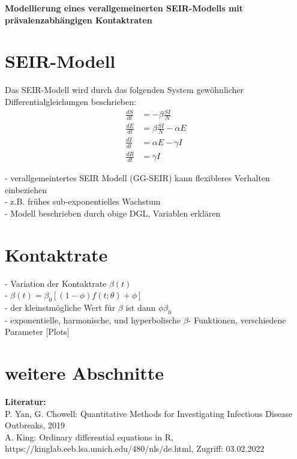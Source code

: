 \documentclass{scrartcl}
\begin{document}
\begin{center}
\huge\textbf{Modellierung eines verallgemeinerten SEIR-Modells mit prävalenzabhängigen Kontaktraten}
\end{center}

\section{SEIR-Modell}

Das SEIR-Modell wird durch das folgenden System gewöhnlicher Differentialgleichungen beschrieben:
\begin{align*}
\frac{dS}{dt} &= -\beta \frac{SI}{N} \\[10pt]
\frac{dE}{dt} &= \beta \frac{SI}{N} - \alpha E \\[10pt]
\frac{dI}{dt} &= \alpha E - \gamma I \\[10pt]
\frac{dR}{dt} &= \gamma I 
\end{align*}

- verallgemeintertes SEIR Modell (GG-SEIR) kann flexibleres Verhalten einbeziehen \\
- z.B. frühes sub-exponentielles Wachstum \\
- Modell beschrieben durch obige DGL, Variablen erklären \\

\section{Kontaktrate}
- Variation der Kontaktrate $\beta(t) $ \\
- $\beta(t) = \beta_0 [(1- \phi) f(t; \theta) + \phi]$ \\
- der kleinstmögliche Wert für $\beta$ ist dann $\phi\beta_0$ \\

- exponentielle, harmonische, und hyperbolische $\beta$- Funktionen, verschiedene Parameter [Plots] \\

\section{weitere Abschnitte}









\vspace*{\fill}
\textbf{Literatur:}  \\
P. Yan, G. Chowell: Quantitative Methods for Investigating Infectious Disease Outbreaks, 2019 \\
A. King: Ordinary differential equations in R, https://kinglab.eeb.lsa.umich.edu/480/nls/de.html, Zugriff: 03.02.2022
\end{document}
